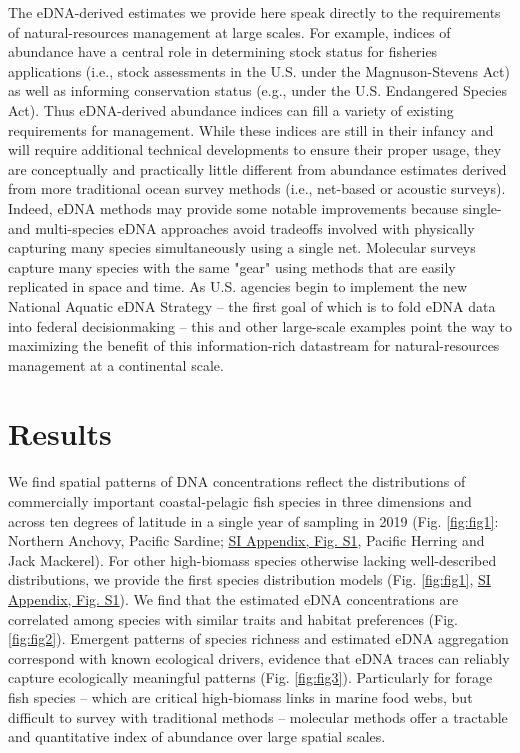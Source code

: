\documentclass[9pt,twocolumn,twoside]{pnas-new}
\begin{document}
The eDNA-derived estimates we provide here speak directly to the requirements of natural-resources management at large scales. For example, indices of abundance have a central role in determining stock status for fisheries applications (i.e., stock assessments in the U.S. under the Magnuson-Stevens Act) as well as informing conservation status (e.g., under the U.S. Endangered Species Act). Thus eDNA-derived abundance indices can fill a variety of existing requirements for management. While these indices are still in their infancy and will require additional technical developments to ensure their proper usage, they are conceptually and practically little different from abundance estimates derived from more traditional ocean survey methods (i.e., net-based or acoustic surveys). Indeed, eDNA methods may provide some notable improvements because single- and multi-species eDNA approaches avoid tradeoffs involved with physically capturing many species simultaneously using a single net. Molecular surveys capture many species with the same "gear" using methods that are easily replicated in space and time. As U.S. agencies begin to implement the new National Aquatic eDNA Strategy \cite{kelly2024} -- the first goal of which is to fold eDNA data into federal decisionmaking -- this and other large-scale examples point the way to maximizing the benefit of this information-rich datastream for natural-resources management at a continental scale.

\section*{Results}

We find spatial patterns of DNA concentrations reflect the distributions of commercially important coastal-pelagic fish species in three dimensions and across ten degrees of latitude in a single year of sampling in 2019 (Fig. \ref{fig:fig1}: Northern Anchovy, Pacific Sardine; \href{SI_Appendix.pdf}{SI Appendix, Fig. S1}, Pacific Herring and Jack Mackerel). For other high-biomass species otherwise lacking well-described distributions, we provide the first species distribution models (Fig. \ref{fig:fig1}, \href{SI_Appendix.pdf}{SI Appendix, Fig. S1}). We find that the estimated eDNA concentrations are correlated among species with similar traits and habitat preferences (Fig. \ref{fig:fig2}). Emergent patterns of species richness and estimated eDNA aggregation correspond with known ecological drivers, evidence that eDNA traces can reliably capture ecologically meaningful patterns (Fig. \ref{fig:fig3}). Particularly for forage fish species – which are critical high-biomass links in marine food webs, but difficult to survey with traditional methods \cite{Pikitch2012} – molecular methods offer a tractable and quantitative index of abundance over large spatial scales.
\end{document}
